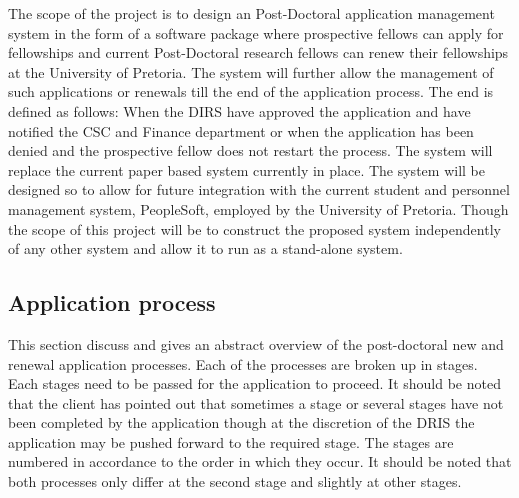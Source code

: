 \documentclass[12pt]{article}
\begin{document}
The scope of the project is to design an Post-Doctoral application management system in the form of a software package where prospective fellows can apply for fellowships and current Post-Doctoral research fellows can renew their fellowships at the University of Pretoria. The system will further allow the management of such applications or renewals till the end of the application process. The end is defined as follows: When the DIRS have approved the application and have notified the CSC and Finance department or when the application has been denied and the prospective fellow does not restart the process. The system will replace the current paper based system currently in place. The system will be designed so to allow for future integration with the current student and personnel management system, PeopleSoft, employed by the University of Pretoria. Though the scope of this project will be to construct the proposed system independently of any other system and allow it to run as a stand-alone system.
\vspace{0.2in}

\subsection{Application process}
This section discuss and gives an abstract overview of the post-doctoral new and renewal application processes. Each of the processes are broken up in stages. Each stages need to be passed for the application to proceed. It should be noted that the client has pointed out that sometimes a stage or several stages have not been completed by the application though at the discretion of the DRIS the application may be pushed forward to the required stage. The stages are numbered in accordance to the order in which they occur. It should be noted that both processes only differ at the second stage and slightly at other stages.
\end{document}
